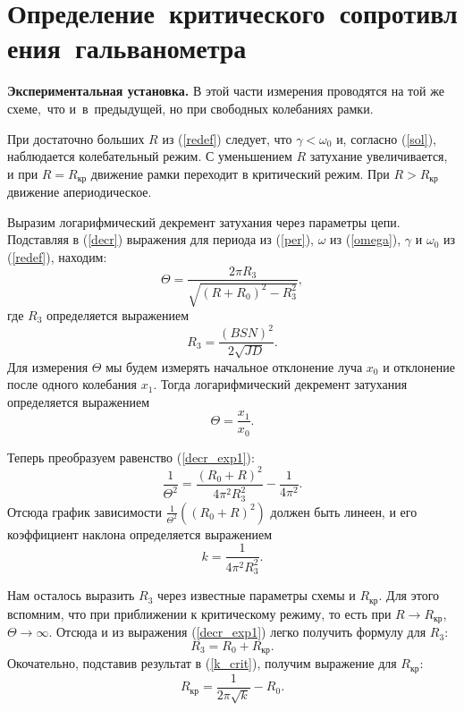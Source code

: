 \documentclass[12pt,a4paper]{article}
\begin{document}
\section{Определение~критического~сопротивления~гальванометра} 
\textbf{Экспериментальная установка.} В этой части измерения проводятся на той же схеме,~что и~в~предыдущей, но при свободных колебаниях рамки.

При достаточно больших $R$ из (\ref{redef}) следует, что $\gamma < \omega_0$ и, согласно (\ref{sol}), наблюдается колебательный режим. С уменьшением $R$ затухание увеличивается, и при $R = R_{\text{кр}}$ движение рамки переходит в критический режим. При $R > R_{\text{кр}}$ движение апериодическое.

Выразим логарифмический декремент затухания через параметры цепи. Подставляя в (\ref{decr}) выражения для периода из (\ref{per}), $\omega$ из (\ref{omega}),  $\gamma$ и $\omega_0$ из (\ref{redef}), находим:
\begin{equation}
\Theta = \frac{2\pi R_3}{\sqrt{{(R+R_0)}^2-R_3^2}},\label{decr_exp1}
\end{equation}
где $R_3$ определяется выражением
\begin{equation}
R_3 = \frac{\left(BSN\right)^2}{2\sqrt{JD}}.\label{r3}
\end{equation}
Для измерения $\Theta$ мы будем измерять начальное отклонение луча $x_0$ и отклонение после одного колебания $x_1$. Тогда логарифмический декремент затухания определяется выражением
\begin{equation}
\Theta = \frac{x_1}{x_0}.\label{decr_exp_d}
\end{equation}

Теперь преобразуем равенство (\ref{decr_exp1}):
\begin{equation}
\frac{1}{\Theta^2}=\frac{\left(R_0+R\right)^2}{4\pi^2R_3^2} - \frac{1}{4\pi^2}.\label{decr_exp2}
\end{equation}
Отсюда график зависимости $\frac{1}{\Theta^2}\left(\left(R_0+R\right)^2\right)$ должен быть линеен, и его коэффициент наклона определяется выражением
\begin{equation}
k = \frac{1}{4\pi^2R_3^2}.\label{k_crit}
\end{equation}

Нам осталось выразить $R_3$ через известные параметры схемы и $R_\text{кр}$. Для этого вспомним, что при приближении к критическому режиму, то есть при $R\to R_\text{кр}$, $\Theta\to\infty$. Отсюда и из выражения (\ref{decr_exp1}) легко получить формулу для $R_3$:
\begin{equation}
R_3 = R_0 + R_\text{кр}.\label{r_3}
\end{equation}
Окочательно, подставив результат в (\ref{k_crit}), получим выражение для $R_\text{кр}:$
\begin{equation}
R_\text{кр} = \frac{1}{2\pi\sqrt{k}} - R_0.\label{r_crit}
\end{equation}
\end{document}
